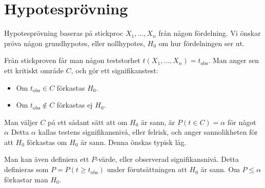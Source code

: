 \section{Hypotesprövning}
Hypotesprövning baseras på stickproc $X_1, \dots, X_n$ från någon fördelning. Vi önskar pröva någon grundhypotes, eller nollhypotes, $H_0$ om hur fördelningen ser ut.

Från stickproven får man någon teststorhet $t(X_1, \dots, X_n) = t_\text{obs}$. Man anger sen ett kritiskt område $C$, och gör ett signifikanstest:
\begin{itemize}
	\item Om $t_\text{obs}\in C$ förkastas $H_0$.
	\item Om $t_\text{obs}\not\in C$ förkastas ej $H_0$.
\end{itemize}
Man väljer $C$ på ett sådant sätt att om $H_0$ är sann, är $P(t\in C) = \alpha$ för något $\alpha$ Detta $\alpha$ kallas testens signifikansnivå, eller felrisk, och anger sannolikheten för att $H_0$ förkastas om $H_0$ är sann. Denna önskas typisk låg.

Man kan även definiera ett $P$-värde, eller observerad signifikansnivå. Detta definieras som $P = P(t\geq t_\text{obs})$ under förutsättningen att $H_0$ är sann. Om $P\leq\alpha$ förkastar man $H_0$.